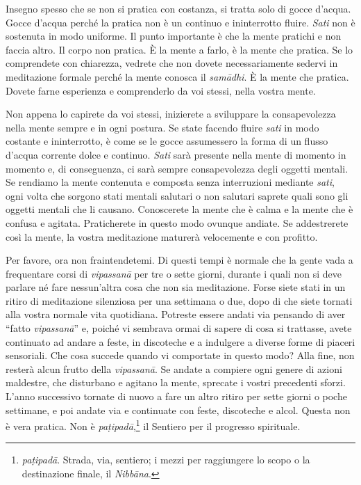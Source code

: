 Insegno spesso che se non si pratica con costanza, si tratta solo di
gocce d'acqua. Gocce d'acqua perché la pratica non è un continuo e
ininterrotto fluire. \emph{Sati} non è sostenuta in modo uniforme. Il
punto importante è che la mente pratichi e non faccia altro. Il corpo
non pratica. È la mente a farlo, è la mente che pratica. Se lo
comprendete con chiarezza, vedrete che non dovete necessariamente
sedervi in meditazione formale perché la mente conosca il
\emph{samādhi}. È la mente che pratica. Dovete farne esperienza e
comprenderlo da voi stessi, nella vostra mente.

Non appena lo capirete da voi stessi, inizierete a sviluppare la
consapevolezza nella mente sempre e in ogni postura. Se state facendo
fluire \emph{sati} in modo costante e ininterrotto, è come se le gocce
assumessero la forma di un flusso d'acqua corrente dolce e continuo.
\emph{Sati} sarà presente nella mente di momento in momento e, di
conseguenza, ci sarà sempre consapevolezza degli oggetti mentali. Se
rendiamo la mente contenuta e composta senza interruzioni mediante
\emph{sati}, ogni volta che sorgono stati mentali salutari o non
salutari saprete quali sono gli oggetti mentali che li causano.
Conoscerete la mente che è calma e la mente che è confusa e agitata.
Praticherete in questo modo ovunque andiate. Se addestrerete così la
mente, la vostra meditazione maturerà velocemente e con profitto.

Per favore, ora non fraintendetemi. Di questi tempi è normale che la
gente vada a frequentare corsi di \emph{vipassanā} per tre o sette
giorni, durante i quali non si deve parlare né fare nessun'altra cosa
che non sia meditazione. Forse siete stati in un ritiro di meditazione
silenziosa per una settimana o due, dopo di che siete tornati alla
vostra normale vita quotidiana. Potreste essere andati via pensando di
aver ``fatto \emph{vipassanā}'' e, poiché vi sembrava ormai di sapere di
cosa si trattasse, avete continuato ad andare a feste, in discoteche e a
indulgere a diverse forme di piaceri sensoriali. Che cosa succede quando
vi comportate in questo modo? Alla fine, non resterà alcun frutto della
\emph{vipassanā}. Se andate a compiere ogni genere di azioni maldestre,
che disturbano e agitano la mente, sprecate i vostri precedenti sforzi.
L'anno successivo tornate di nuovo a fare un altro ritiro per sette
giorni o poche settimane, e poi andate via e continuate con feste,
discoteche e alcol. Questa non è vera pratica. Non è
\emph{paṭipadā},\footnote{\emph{paṭipadā}. Strada, via, sentiero; i
  mezzi per raggiungere lo scopo o la destinazione finale, il
  \emph{Nibbāna}.} il Sentiero per il progresso spirituale.

